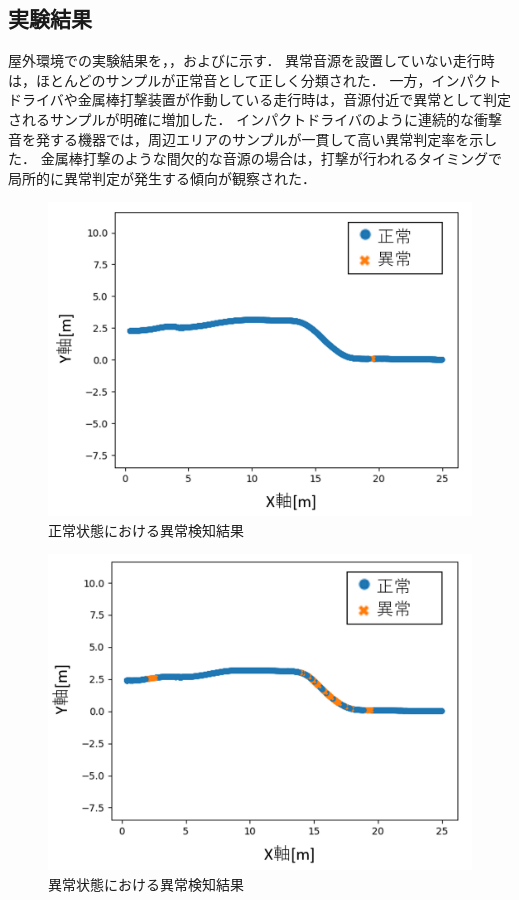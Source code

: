 \documentclass[../main]{subfiles}
\begin{document}
\subsection{実験結果}
\label{subsec:vexp_ci_result}
屋外環境での実験結果を，，およびに示す．
異常音源を設置していない走行時は，ほとんどのサンプルが正常音として正しく分類された．
一方，インパクトドライバや金属棒打撃装置が作動している走行時は，音源付近で異常として判定されるサンプルが明確に増加した．
インパクトドライバのように連続的な衝撃音を発する機器では，周辺エリアのサンプルが一貫して高い異常判定率を示した．
金属棒打撃のような間欠的な音源の場合は，打撃が行われるタイミングで局所的に異常判定が発生する傾向が観察された．
\begin{figure}[t]
  \centering
  \includegraphics[keepaspectratio, width=0.7\linewidth]{chap4/field_normal.png}
  \caption{正常状態における異常検知結果}
  \label{fig:field_normal}
\end{figure}


\begin{figure}[t]
  \centering
  \includegraphics[keepaspectratio, width=0.7\linewidth]{chap4/field_abnormal1.png}
  \caption{異常状態における異常検知結果}
  \label{fig:field_abnormal1}
\end{figure}
\end{document}
